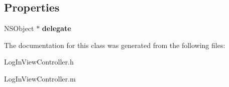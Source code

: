 \subsection*{Properties}
\begin{DoxyCompactItemize}
\item 
\hypertarget{interface_log_in_view_controller_a36401da70954f8611d43eec8b4827e64}{
NSObject $\ast$ {\bfseries delegate}}
\label{interface_log_in_view_controller_a36401da70954f8611d43eec8b4827e64}

\end{DoxyCompactItemize}


The documentation for this class was generated from the following files:\begin{DoxyCompactItemize}
\item 
LogInViewController.h\item 
LogInViewController.m\end{DoxyCompactItemize}
